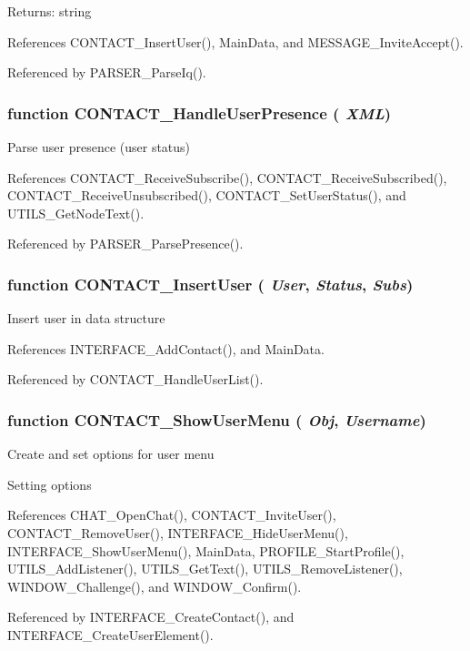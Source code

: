 \begin{Desc}
\item[Returns:]string \end{Desc}


References CONTACT\_\-InsertUser(), MainData, and MESSAGE\_\-InviteAccept().

Referenced by PARSER\_\-ParseIq().
\subsubsection{\setlength{\rightskip}{0pt plus 5cm}function CONTACT\_\-HandleUserPresence ( {\em XML})}\label{contact_2contact_8js_53500c8e9abf607022b79c6b131e2f39}


Parse user presence (user status) 

References CONTACT\_\-ReceiveSubscribe(), CONTACT\_\-ReceiveSubscribed(), CONTACT\_\-ReceiveUnsubscribed(), CONTACT\_\-SetUserStatus(), and UTILS\_\-GetNodeText().

Referenced by PARSER\_\-ParsePresence().
\subsubsection{\setlength{\rightskip}{0pt plus 5cm}function CONTACT\_\-InsertUser ( {\em User}, \/   {\em Status}, \/   {\em Subs})}\label{contact_2contact_8js_2c2a47451ed094e54747852e31db0a94}


Insert user in data structure 

References INTERFACE\_\-AddContact(), and MainData.

Referenced by CONTACT\_\-HandleUserList().
\subsubsection{\setlength{\rightskip}{0pt plus 5cm}function CONTACT\_\-ShowUserMenu ( {\em Obj}, \/   {\em Username})}\label{contact_2contact_8js_8c339eb1f5ab5660dde74ee3c92061d3}


Create and set options for user menu 

Setting options 

References CHAT\_\-OpenChat(), CONTACT\_\-InviteUser(), CONTACT\_\-RemoveUser(), INTERFACE\_\-HideUserMenu(), INTERFACE\_\-ShowUserMenu(), MainData, PROFILE\_\-StartProfile(), UTILS\_\-AddListener(), UTILS\_\-GetText(), UTILS\_\-RemoveListener(), WINDOW\_\-Challenge(), and WINDOW\_\-Confirm().

Referenced by INTERFACE\_\-CreateContact(), and INTERFACE\_\-CreateUserElement().